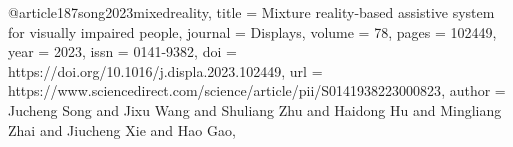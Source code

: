 @article{187song2023mixedreality,
title = {Mixture reality-based assistive system for visually impaired people},
journal = {Displays},
volume = {78},
pages = {102449},
year = {2023},
issn = {0141-9382},
doi = {https://doi.org/10.1016/j.displa.2023.102449},
url = {https://www.sciencedirect.com/science/article/pii/S0141938223000823},
author = {Jucheng Song and Jixu Wang and Shuliang Zhu and Haidong Hu and Mingliang Zhai and Jiucheng Xie and Hao Gao},
}